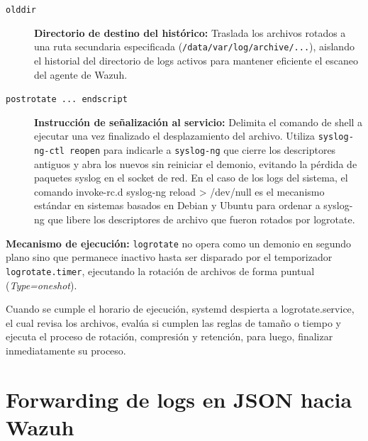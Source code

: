 \begin{description}
    \item[\texttt{olddir}] \textbf{Directorio de destino del histórico:} Traslada los archivos rotados a una ruta secundaria especificada (\texttt{/data/var/log/archive/...}), aislando el historial del directorio de logs activos para mantener eficiente el escaneo del agente de Wazuh.

    \item[\texttt{postrotate ... endscript}] \textbf{Instrucción de señalización al servicio:} Delimita el comando de shell a ejecutar una vez finalizado el desplazamiento del archivo. Utiliza \texttt{syslog-ng-ctl reopen} para indicarle a \texttt{syslog-ng} que cierre los descriptores antiguos y abra los nuevos sin reiniciar el demonio, evitando la pérdida de paquetes syslog en el socket de red. En el caso de los logs del sistema, el comando invoke-rc.d syslog-ng reload > /dev/null es el mecanismo estándar en sistemas basados en Debian y Ubuntu para ordenar a syslog-ng que libere los descriptores de archivo que fueron rotados por logrotate.
\end{description}

\textbf{Mecanismo de ejecución:} \texttt{logrotate} no opera como un demonio en segundo plano sino que permanece inactivo hasta ser disparado por el temporizador \texttt{logrotate.timer}, ejecutando la rotación de archivos de forma puntual (\textit{Type=oneshot}).

Cuando se cumple el horario de ejecución, systemd despierta a logrotate.service, el cual revisa los archivos, evalúa si cumplen las reglas de tamaño o tiempo y ejecuta el proceso de rotación, compresión y retención, para luego, finalizar inmediatamente su proceso.

\section{Forwarding de logs en JSON hacia Wazuh}

